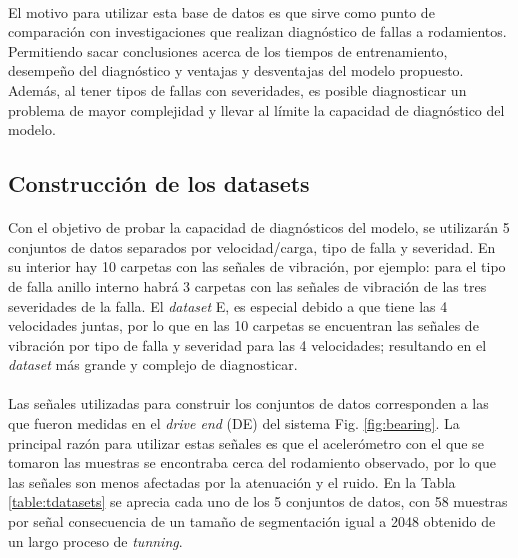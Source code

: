 \documentclass[12pt]{article}%
\begin{document}
\paragraph{}
El motivo para utilizar esta base de datos es que sirve como punto de comparación con investigaciones que realizan diagnóstico de fallas a rodamientos. Permitiendo sacar conclusiones acerca de los tiempos de entrenamiento, desempeño del diagnóstico y ventajas y desventajas del modelo propuesto. Además, al tener tipos de fallas con severidades, es posible diagnosticar un problema de mayor complejidad y llevar al límite la capacidad de diagnóstico del modelo.

\subsection{Construcción de los datasets}
\label{sec:datasets}

\paragraph{}
Con el objetivo de probar la capacidad de diagnósticos del modelo, se utilizarán 5 conjuntos de datos separados por velocidad/carga, tipo de falla y severidad. En su interior hay 10 carpetas con las señales de vibración, por ejemplo: para el tipo de falla anillo interno habrá 3 carpetas con las señales de vibración de las tres severidades de la falla. El \textit{dataset} E, es especial debido a que tiene las 4 velocidades juntas, por lo que en las 10 carpetas se encuentran las señales de vibración por tipo de falla y severidad para las 4 velocidades; resultando en el \textit{dataset} más grande y complejo de diagnosticar.

\paragraph{}
Las señales utilizadas para construir los conjuntos de datos corresponden a las que fueron medidas en el \textit{drive end} (DE) del sistema Fig. \ref{fig:bearing}. La principal razón para utilizar estas señales es que el acelerómetro con el que se tomaron las muestras se encontraba cerca del rodamiento observado, por lo que las señales son menos afectadas por la atenuación y el ruido. En la Tabla \ref{table:tdatasets} se aprecia cada uno de los 5 conjuntos de datos, con 58 muestras por señal consecuencia de un tamaño de segmentación igual a 2048 obtenido de un largo proceso de \textit{tunning}.
\end{document}
